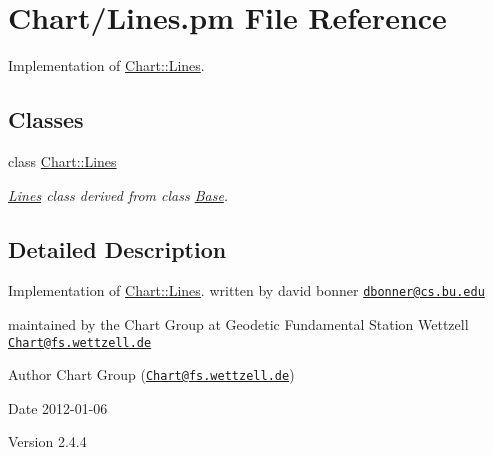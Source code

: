 \hypertarget{Lines_8pm}{
\section{Chart/Lines.pm File Reference}
\label{Lines_8pm}
}


Implementation of \hyperlink{classChart_1_1Lines}{Chart::Lines}.  


\subsection*{Classes}
\begin{DoxyCompactItemize}
\item 
class \hyperlink{classChart_1_1Lines}{Chart::Lines}
\begin{DoxyCompactList}\small\item\em \hyperlink{classChart_1_1Lines}{Lines} class derived from class \hyperlink{classChart_1_1Base}{Base}. \item\end{DoxyCompactList}\end{DoxyCompactItemize}


\subsection{Detailed Description}
Implementation of \hyperlink{classChart_1_1Lines}{Chart::Lines}. written by david bonner \href{mailto:dbonner@cs.bu.edu}{\tt dbonner@cs.bu.edu}

maintained by the Chart Group at Geodetic Fundamental Station Wettzell \href{mailto:Chart@fs.wettzell.de}{\tt Chart@fs.wettzell.de} \begin{DoxyAuthor}{Author}
Chart Group (\href{mailto:Chart@fs.wettzell.de}{\tt Chart@fs.wettzell.de}) 
\end{DoxyAuthor}
\begin{DoxyDate}{Date}
2012-\/01-\/06 
\end{DoxyDate}
\begin{DoxyVersion}{Version}
2.4.4 
\end{DoxyVersion}
